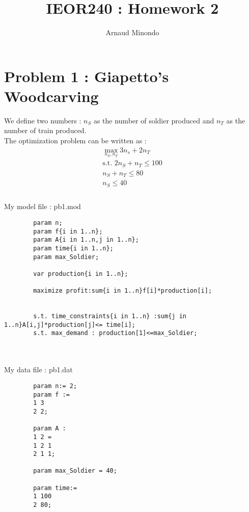 \documentclass{article}
\title{IEOR240 : Homework 2}
\author{Arnaud Minondo}
\newenvironment{DDbox}[1]{
\begin{lrbox}{\BBbox}
    \begin{minipage}{\linewidth}}
{\end{minipage}
\end{lrbox}\noindent\colorbox{Zgris}{\usebox{\BBbox}} \\
[.5cm]}
\begin{document}
\maketitle
\section*{Problem 1 : Giapetto's Woodcarving}
We define two numbers : $n_S$ as the number of soldier produced and $n_T$ as the number of train produced.
\\
The optimization problem can be written as : 
\begin{equation}
    \begin{array}{c}
        \max_{n_S,n_T}{3n_s+2n_T}\\
        \text{s.t. }2n_S+n_T\leq 100  \\
        n_S+n_T \leq 80  \\
        n_S\leq 40 \\

    \end{array}
\end{equation}
\\
My model file : pb1.mod
\\
\begin{DDbox}{\linewidth}
    \begin{verbatim}
        param n;
        param f{i in 1..n};
        param A{i in 1..n,j in 1..n};
        param time{i in 1..n};
        param max_Soldier;

        var production{i in 1..n};

        maximize profit:sum{i in 1..n}f[i]*production[i];


        s.t. time_constraints{i in 1..n} :sum{j in 1..n}A[i,j]*production[j]<= time[i];
        s.t. max_demand : production[1]<=max_Soldier;  
    \end{verbatim}
\end{DDbox}
\\
My data file : pb1.dat
\\
\begin{DDbox}{\linewidth}
    \begin{verbatim}
        param n:= 2;
        param f := 
        1 3 
        2 2;

        param A :
        1 2 =
        1 2 1
        2 1 1;

        param max_Soldier = 40;

        param time:= 
        1 100 
        2 80;
    \end{verbatim}
\end{DDbox}
\end{document}
